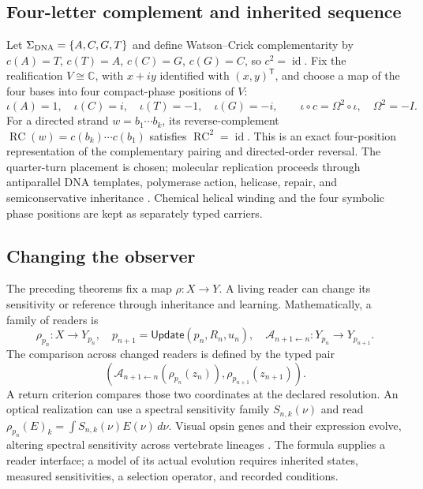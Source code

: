 \documentclass[10pt,letterpaper]{article}
\theoremstyle{definition}\newtheorem{definition}[theorem]{Definition}
\begin{document}
\subsection*{Four-letter complement and inherited sequence}
Let $\Sigma_{\rm DNA}=\{A,C,G,T\}$ and define Watson--Crick complementarity by $c(A)=T$, $c(T)=A$, $c(C)=G$, $c(G)=C$, so $c^2=\operatorname{id}$. Fix the realification $V\cong\mathbb C$, with $x+iy$ identified with $(x,y)^{\mathsf T}$, and choose a map of the four bases into four compact-phase positions of $V$:
\begin{equation}\label{eq:dna}
 \iota(A)=1,\quad \iota(C)=i,\quad\iota(T)=-1,\quad\iota(G)=-i,
 \qquad\boxed{\iota\circ c=\Omega^2\circ\iota,\quad\Omega^2=-I.}
\end{equation}
For a directed strand $w=b_1\cdots b_k$, its reverse-complement $\operatorname{RC}(w)=c(b_k)\cdots c(b_1)$ satisfies $\operatorname{RC}^2=\operatorname{id}$. This is an exact four-position representation of the complementary pairing and directed-order reversal. The quarter-turn placement is chosen; molecular replication proceeds through antiparallel DNA templates, polymerase action, helicase, repair, and semiconservative inheritance \cite{watsoncrick,meselsonstahl,dnatext}. Chemical helical winding and the four symbolic phase positions are kept as separately typed carriers.

\subsection*{Changing the observer}
The preceding theorems fix a map $\rho:X\to Y$. A living reader can change its sensitivity or reference through inheritance and learning. Mathematically, a family of readers is
\begin{equation}\label{eq:readerfamily}
 \rho_{p_n}:X\longrightarrow Y_{p_n},\quad
 p_{n+1}=\mathsf{Update}(p_n,R_n,u_n),\quad
 \mathcal A_{n+1\leftarrow n}:Y_{p_n}\longrightarrow Y_{p_{n+1}}.
\end{equation}
The comparison across changed readers is defined by the typed pair
\begin{equation}\label{eq:readercompare}
 \left(\mathcal A_{n+1\leftarrow n}(\rho_{p_n}(z_n)),\rho_{p_{n+1}}(z_{n+1})\right).
\end{equation}
A return criterion compares those two coordinates at the declared resolution. An optical realization can use a spectral sensitivity family $S_{n,k}(\nu)$ and read $\rho_{p_n}(E)_k=\int S_{n,k}(\nu)E(\nu)\,d\nu$. Visual opsin genes and their expression evolve, altering spectral sensitivity across vertebrate lineages \cite{opsinreview}. The formula supplies a reader interface; a model of its actual evolution requires inherited states, measured sensitivities, a selection operator, and recorded conditions.
\end{document}
